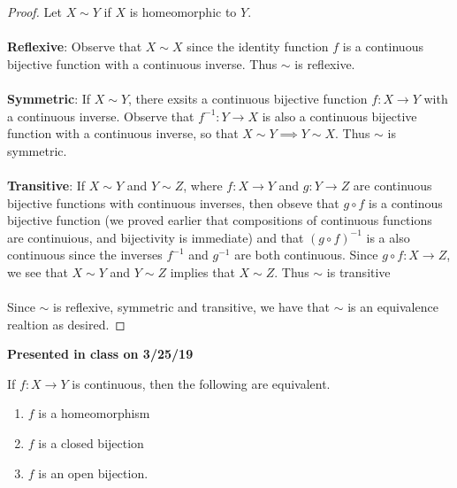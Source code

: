 \documentclass[letter,12pt,twoside]{hmcpset}
\begin{document}
\begin{proof}
    Let $X \sim Y$ if $X$ is homeomorphic to $Y$. 
    \\
    \\
    \textbf{Reflexive}: Observe that $X \sim X$ since the identity function $f$
    is a continuous bijective function with a continuous inverse. Thus
    $\sim$ is reflexive. 
    \\
    \\
    \textbf{Symmetric}: If $X \sim Y$, there exsits a continuous bijective
    function $f : X \rightarrow Y$ with a continuous inverse.
    Observe that $f^{-1} : Y \rightarrow X$ is also a continuous bijective
    function with a continuous inverse, so that $X \sim Y \implies Y
    \sim X$. Thus $\sim$ is symmetric.
    \\
    \\
    \textbf{Transitive}: 
    If $X \sim Y$ and $Y \sim Z$, where $f: X \rightarrow Y$ and $g :
    Y \rightarrow Z$ are continuous bijective functions with
    continuous inverses, then obseve that $g \circ f$ is a continous
    bijective function (we proved earlier that compositions of
    continuous functions are continuious, and bijectivity is
    immediate)
    and that $(g \circ f)^{-1}$ is a also continuous since the
    inverses $f^{-1}$ and $g^{-1}$ are both continuous. Since $g \circ
    f : X \rightarrow Z$, we see that $X \sim Y$ and $Y \sim Z$
    implies that $X \sim Z$. Thus $\sim$ is transitive
    \\
    \\
    Since $\sim$ is reflexive, symmetric and transitive, we have that
    $\sim$ is an equivalence realtion as desired.

\end{proof}

\noindent
\textbf{Presented in class on 3/25/19}
\\
\begin{problem}[Theorem 8.28]
    If $f : X \rightarrow Y$ is continuous, then the following are
    equivalent. 
    \begin{enumerate}
        \item $f$ is a homeomorphism 
        \item $f$ is a closed bijection
        \item $f$ is an open bijection.
    \end{enumerate}
\end{problem}
\end{document}
